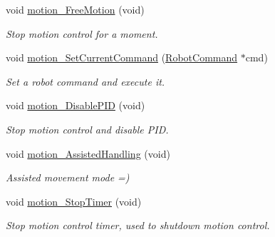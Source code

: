 \begin{DoxyCompactItemize}
\item 
\mbox{\label{classAsservInsa_abfd039891e955c93bcfaf905d92ff03e}} 
void \hyperlink{classAsservInsa_abfd039891e955c93bcfaf905d92ff03e}{motion\+\_\+\+Free\+Motion} (void)
\begin{DoxyCompactList}\small\item\em Stop motion control for a moment. \end{DoxyCompactList}\item 
\mbox{\label{classAsservInsa_aa419b5594a43c9133b81b64ceac4e40f}} 
void \hyperlink{classAsservInsa_aa419b5594a43c9133b81b64ceac4e40f}{motion\+\_\+\+Set\+Current\+Command} (\hyperlink{structRobotCommand}{Robot\+Command} $\ast$cmd)
\begin{DoxyCompactList}\small\item\em Set a robot command and execute it. \end{DoxyCompactList}\item 
\mbox{\label{classAsservInsa_aaa40cb7703fd06105886f7d606edc719}} 
void \hyperlink{classAsservInsa_aaa40cb7703fd06105886f7d606edc719}{motion\+\_\+\+Disable\+P\+ID} (void)
\begin{DoxyCompactList}\small\item\em Stop motion control and disable P\+ID. \end{DoxyCompactList}\item 
\mbox{\label{classAsservInsa_a847f01f6565d04782ac49a64a8952e7d}} 
void \hyperlink{classAsservInsa_a847f01f6565d04782ac49a64a8952e7d}{motion\+\_\+\+Assisted\+Handling} (void)
\begin{DoxyCompactList}\small\item\em Assisted movement mode =) \end{DoxyCompactList}\item 
\mbox{\label{classAsservInsa_ac80c0e514cddf1dc5f3eade9fa5dd329}} 
void \hyperlink{classAsservInsa_ac80c0e514cddf1dc5f3eade9fa5dd329}{motion\+\_\+\+Stop\+Timer} (void)
\begin{DoxyCompactList}\small\item\em Stop motion control timer, used to shutdown motion control. \end{DoxyCompactList}\item 
\mbox{\label{classAsservInsa_a4d839cdd298a4e24f57b5a298e6f463e}} 

\end{DoxyCompactItemize}
